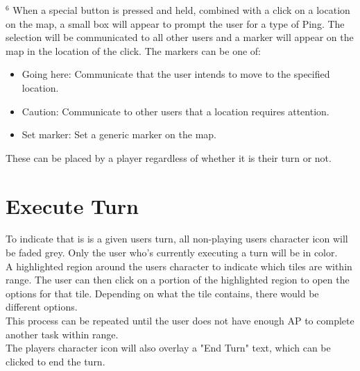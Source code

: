 \documentclass[12pt]{article}
\theoremstyle{definition}
\begin{document}
$^6$ When a special button is pressed and held, combined with a click on a location on the map, a small box will appear to prompt the user for a type of Ping. The selection will be communicated to all other users and a marker will appear on the map in the location of the click. The markers can be one of: 
\begin{itemize}
	\item Going here: Communicate that the user intends to move to the specified location.
	\item Caution: Communicate to other users that a location requires attention.
	\item Set marker: Set a generic marker on the map. 
\end{itemize}
These can be placed by a player regardless of whether it is their turn or not.
\section*{Execute Turn}
To indicate that is is a given users turn, all non-playing users character icon will be faded grey. Only the user who's currently executing a turn will be in color. 
\\ \linebreak
A highlighted region around the users character to indicate which tiles are within range. The user can then click on a portion of the highlighted region to open the options for that tile. Depending on what the tile contains, there would be different options.
\\ \linebreak
This process can be repeated until the user does not have enough AP to complete another task within range.
\\ \linebreak
The players character icon will also overlay a "End Turn" text, which can be clicked to end the turn.
\\ \linebreak
\end{document}
